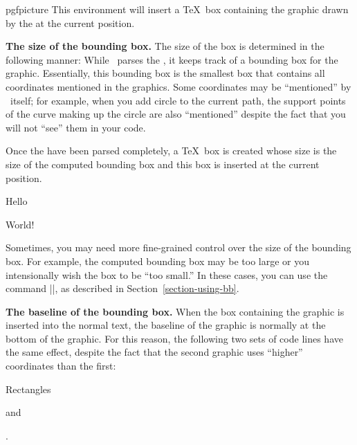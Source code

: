 \begin{environment}{{pgfpicture}}
  This environment will insert a \TeX\ box containing the graphic drawn by
  the  at the current position.

  \medskip
  \textbf{The size of the bounding box.}
  The size of the box is determined in the following
  manner: While \pgfname\ parses the , it
  keeps track of a bounding box for the graphic. Essentially, this
  bounding box is the smallest box that contains all coordinates
  mentioned in the graphics. Some coordinates may be ``mentioned'' by
  \pgfname\ itself; for example, when you add circle to the current
  path, the support points of the curve making up the circle are also
  ``mentioned'' despite the fact that you will not ``see'' them in
  your code.

  Once the  have been parsed completely, a
  \TeX\ box is created whose size is the size of the computed bounding
  box and this box is inserted at the current position.

\begin{codeexample}[]
Hello \begin{pgfpicture}
  \pgfpathrectangle{\pgfpointorigin}{\pgfpoint{2ex}{1ex}}
\end{pgfpicture} World!
\end{codeexample}

  Sometimes, you may need more fine-grained control over the size of
  the bounding box. For example, the computed bounding box may be too
  large or you intensionally wish the box to be ``too small.'' In
  these cases, you can use the command
  ||, as described in
  Section~\ref{section-using-bb}.


  \medskip
  \textbf{The baseline of the bounding box.}
  When the box containing the graphic is inserted into the normal
  text, the baseline of the graphic is normally at the bottom of the
  graphic. For this reason, the following two sets of code lines have
  the same effect, despite the fact that the second graphic uses
  ``higher'' coordinates than the first:

\begin{codeexample}[]
Rectangles \begin{pgfpicture}
  \pgfpathrectangle{\pgfpointorigin}{\pgfpoint{2ex}{1ex}}
\end{pgfpicture} and \begin{pgfpicture}
  \pgfpathrectangle{\pgfpoint{0ex}{1ex}}{\pgfpoint{2ex}{1ex}}
\end{pgfpicture}.
\end{codeexample}


\end{environment}
